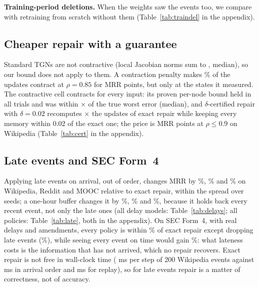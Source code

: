\documentclass{article}
\begin{document}
\textbf{Training-period deletions.} When the weights saw the events too, we compare with retraining from scratch without them
(Table~\ref{tab:traindel} in the appendix). \TrainDelText

\subsection{Cheaper repair with a guarantee}
\label{sec:cert}

Standard TGNs are not contractive (local Jacobian norms sum to \ConVanillaJsum, median), so our bound does not apply to them.
A contraction penalty makes \CertEightFive\% of the updates contract at $\rho=0.85$ for \MrrLossEightFive{} MRR points, but only
at the states it measured. The contractive cell contracts for every input: its proven per-node bound held in all trials and
was within \RigRatioNineCell$\times$ of the true worst error (median), and $\delta$-certified repair with $\delta=0.02$
recomputes \CertRepairCostNineCell$\times$ the updates of exact repair while keeping every memory within 0.02 of the exact one;
the price is \MrrLossNineCell{} MRR points at $\rho\le0.9$ on Wikipedia (Table~\ref{tab:cert} in the appendix).

\subsection{Late events and SEC Form~4}
\label{sec:late}

Applying late events on arrival, out of order, changes MRR by \ArrivalRelWiki\%, \ArrivalRelReddit\% and \ArrivalRelMooc\% on
Wikipedia, Reddit and MOOC relative to exact repair, within the spread over seeds; a one-hour buffer changes it by
\BufOneRelWiki\%, \BufOneRelReddit\% and \BufOneRelMooc\%, because it holds back every recent event, not only the late ones
(all delay models: Table~\ref{tab:delays}; all policies: Table~\ref{tab:late}, both in the appendix). On SEC Form~4, with
real delays and amendments, every policy is within \SecSpreadPct\% of exact repair except dropping late events
(\SecDropRel\%), while seeing every event on time would gain \SecOracleRel\%: what lateness costs is the information that
has not arrived, which no repair recovers. Exact repair is not free in wall-clock time (\BenchStreamExactMsWiki{} ms per step
of 200 Wikipedia events against \BenchStreamArrivalMsWiki{} ms in arrival order and \BenchStreamReplayMsWiki{} ms for replay),
so for late events repair is a matter of correctness, not of accuracy.
\end{document}
